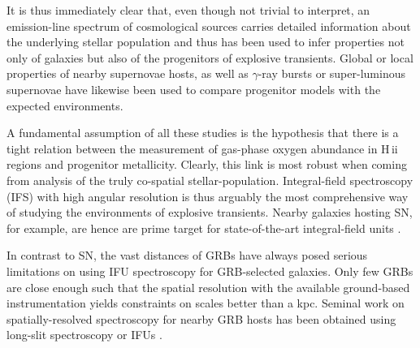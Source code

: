 \documentclass[traditabstract]{aa}
\newcommand{\hii}{\mbox{H\,{\sc ii}}}
\begin{document}
It is thus immediately clear that, even though not trivial to interpret, an emission-line spectrum of cosmological sources carries detailed information about the underlying stellar population and thus has been used to infer properties not only of galaxies but also of the progenitors of explosive transients. Global \citep[e.g.,][]{2008ApJ...673..999P, 2011MNRAS.412.1441L} or local \citep[e.g.,][]{2010MNRAS.407.2660A, 2011ApJ...731L...4M, 2011A&A...530A..95L} properties of nearby supernovae hosts, as well as $\gamma$-ray bursts \citep[e.g.,][]{2007A&A...464..529W, 2012A&A...546A...8K} or super-luminous supernovae \citep[e.g.,][]{2013ApJ...763L..28C, 2014ApJ...787..138L, 2014arXiv1409.8331L, 2016arXiv160408207P} have likewise been used to compare progenitor models with the expected environments. 

A fundamental assumption of all these studies is the hypothesis that there is a tight relation between the measurement of gas-phase oxygen abundance in \hii\,regions and progenitor metallicity. Clearly, this link is most robust when coming from analysis of the truly co-spatial stellar-population. Integral-field spectroscopy (IFS) with high angular resolution is thus arguably the most comprehensive way of studying the environments of explosive transients. Nearby galaxies hosting SN, for example, are hence are prime target for state-of-the-art integral-field units \citep[IFUs, e.g.,][]{2013AJ....146...30K, 2014A&A...572A..38G}.

In contrast to SN, the vast distances of GRBs have always posed serious limitations on using IFU spectroscopy for GRB-selected galaxies. Only few GRBs are close enough such that the spatial resolution with the available ground-based instrumentation yields constraints on scales better than a kpc. Seminal work on spatially-resolved spectroscopy for nearby GRB hosts has been obtained using long-slit spectroscopy \citep[e.g.,][]{2008ApJ...676.1151T, 2011ApJ...739...23L, 2015A&A...579A.126S} or IFUs \citep{2008A&A...490...45C, 2014MNRAS.441.2034T}. 
\end{document}
